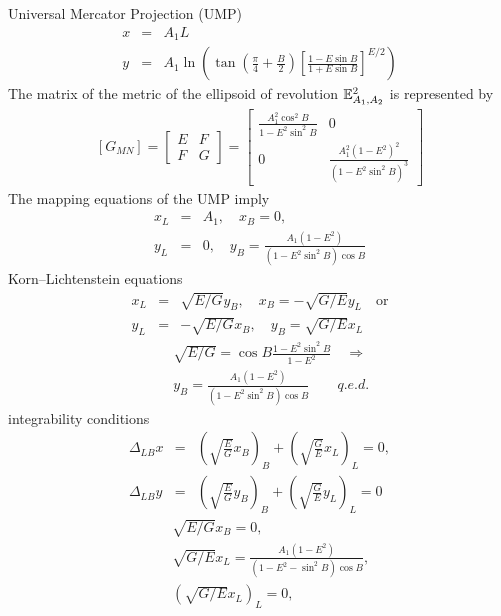 \documentclass[jog]{svjour}
\begin{document}
\begin{example}\label{ex:1}
Universal Mercator Projection (UMP)
\begin{eqnarray*}
x &= &A_1L \\
y &= &A_1\ln\left(\tan\left(\frac{\pi}{4}+\frac{B}{2}\right)
\left[\frac{1-E\sin B}{1+E\sin B}\right]^{E/2}\right)
\end{eqnarray*}
The matrix of the metric of the ellipsoid of revolution
$\Bbb{E}^2_{A_1,A_2}$ is represented by
\begin{eqnarray*}
\left[G_{MN}\right]
 \!=\! \left[\begin{array}{cc}
 E&F\\F&G\end{array}
 \right] \!=\! \left[\begin{array}{cc}
 {\displaystyle\frac{A^2_1\cos^2B}{1-E^2\sin^2B}}&0\\
 0&{\displaystyle\frac{A^2_1(1-E^2)^2}{(1-E^2\sin^2B)^3}}
 \end{array}
 \right]
\end{eqnarray*}
The mapping equations of the UMP imply
\begin{eqnarray*}
x_L &= &A_1, \quad x_B = 0, \\
y_L &= &0, \quad y_B = {\frac{A_1(1-E^2)}{(1-E^2\sin^2B)\cos B}}
\end{eqnarray*}
Korn--Lichtenstein equations
\begin{eqnarray*}
x_L &= &\sqrt{E/G}y_B, \quad x_B = -\sqrt{G/E}y_L \quad \mathrm{or} \\
y_L &= &-\sqrt{E/G}x_B, \quad y_B=\sqrt{G/E}x_L
\end{eqnarray*}
\begin{eqnarray*}
& &\sqrt{E/G} = \cos B\frac{1-E^2\sin^2B}{1-E^2} \quad \Longrightarrow \\
& &y_B = \frac{A_1(1-E^2)}{(1-E^2\sin^2B)\cos B} \qquad q.e.d.
\end{eqnarray*}
integrability conditions
\begin{eqnarray*}
\Delta_{LB}x &= &\left(\sqrt{\frac{E}{G}}x_B\right)_B+\left(\sqrt{\frac{G}{E}}x_L\right)_L=0, \\
\Delta_{LB}y &= &\left(\sqrt{\frac{E}{G}}y_B\right)_B+\left(\sqrt{\frac{G}{E}}y_L\right)_L=0
\end{eqnarray*}
\begin{eqnarray*}
& &\sqrt{{E}/{G}}x_B = 0, \\
& &\sqrt{{G}/{E}}x_L = {\frac{A_1(1-E^2)}{(1-E^2-\sin^2B)\cos B}}, \\
& &(\sqrt{{G}/{E}}x_L)_L = 0, \\

\end{eqnarray*}
\end{example}
\end{document}
